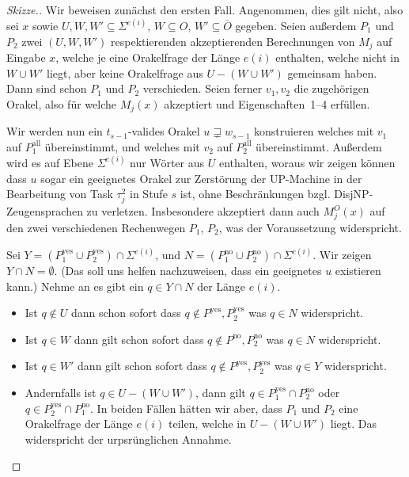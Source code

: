 \documentclass[nofonts]{uebung}
\theoremstyle{definition}
\begin{document}
\begin{proof}[Skizze.]
    Wir beweisen zunächst den ersten Fall.
    Angenommen, dies gilt nicht, also sei $x$ sowie $U,W,W'\subseteq \Sigma^{e(i)}$, $W\subseteq O$, $W'\subseteq\overline{O}$ gegeben.
    Seien außerdem $P_1$ und $P_2$ zwei $(U, W, W')$ respektierenden akzeptierenden Berechnungen von $M_j$ auf Eingabe $x$,
    welche je eine Orakelfrage der Länge $e(i)$ enthalten, welche nicht in $W\cup W'$ liegt,
    aber keine Orakelfrage aus $U-(W\cup W')$ gemeinsam haben.
    Dann sind schon $P_1$ und $P_2$ verschieden.
    Seien ferner $v_1, v_2$ die zugehörigen Orakel, also für welche $M_j(x)$ akzeptiert und Eigenschaften~1--4 erfüllen.

    Wir werden nun ein $t_{s-1}$-valides Orakel $u\sqsupsetneq w_{s-1}$ konstruieren welches mit $v_1$ auf $P^\mathrm{all}_1$ übereinstimmt, und welches mit $v_2$ auf $P^\mathrm{all}_2$ übereinstimmt.
    Außerdem wird es auf Ebene $\Sigma^{e(i)}$ nur Wörter aus $U$ enthalten, woraus wir zeigen können dass $u$ sogar ein geeignetes Orakel zur Zerstörung der UP-Machine in der Bearbeitung von Task $\tau^2_{j}$ in Stufe $s$ ist, ohne Beschränkungen bzgl. DisjNP-Zeugensprachen zu verletzen. Insbesondere akzeptiert dann auch $M_j^O(x)$ auf den zwei verschiedenen Rechenwegen $P_1$, $P_2$, was der Voraussetzung widerspricht.

    Sei $Y=(P^\mathrm{yes}_1\cup P^\mathrm{yes}_2)\cap\Sigma^{e(i)}$, und $N=(P^\mathrm{no}_1\cup P^\mathrm{no}_2)\cap\Sigma^{e(i)}$.
    Wir zeigen $Y\cap N = \emptyset$. (Das soll uns helfen nachzuweisen, dass ein geeignetes $u$ existieren kann.)
    Nehme an es gibt ein $q\in Y\cap N$ der Länge $e(i)$.
    \begin{itemize}[noitemsep]
        \item Ist $q\not\in U$ dann schon sofort dass $q\not\in P^\mathrm{yes}, P^\mathrm{yes}_2$ was $q\in N$ widerspricht.
        \item Ist $q\in W$ dann gilt schon sofort dass $q\not\in P^\mathrm{no}, P^\mathrm{no}_2$ was $q\in N$ widerspricht.
        \item Ist $q\in W'$ dann gilt schon sofort dass $q\not\in P^\mathrm{yes}, P^\mathrm{yes}_2$ was $q\in Y$ widerspricht.
        \item Andernfalls ist $q\in U-( W\cup W')$, dann gilt $q\in P^\mathrm{yes}_1\cap P^\mathrm{no}_2$ oder $q\in P^\mathrm{yes}_2\cap P^\mathrm{no}_1$.
            In beiden Fällen hätten wir aber, dass $P_1$ und $P_2$ eine Orakelfrage der Länge $e(i)$ teilen, welche in $U-(W\cup W')$ liegt. Das widerspricht der urpsrünglichen Annahme.
    \end{itemize}


\end{proof}
\end{document}
